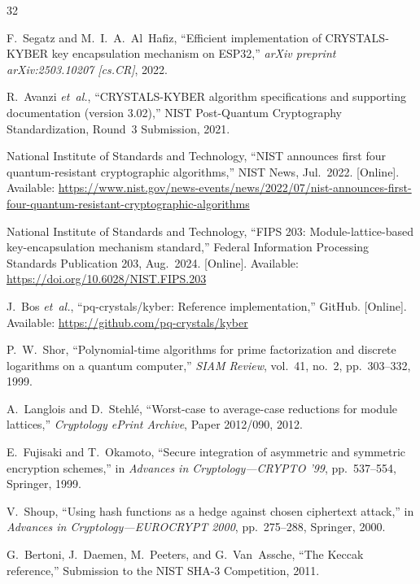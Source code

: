 \documentclass[journal]{IEEEtran}
\begin{document}
\begin{thebibliography}{32}

F.~Segatz and M.~I.~A.~Al~Hafiz, ``Efficient implementation of CRYSTALS-KYBER key encapsulation mechanism on ESP32,'' \emph{arXiv preprint arXiv:2503.10207 [cs.CR]}, 2022.

R.~Avanzi \emph{et~al.}, ``CRYSTALS-KYBER algorithm specifications and supporting documentation (version 3.02),'' NIST Post-Quantum Cryptography Standardization, Round~3 Submission, 2021.

National Institute of Standards and Technology, ``NIST announces first four quantum-resistant cryptographic algorithms,'' NIST News, Jul.\ 2022. [Online]. Available: \url{https://www.nist.gov/news-events/news/2022/07/nist-announces-first-four-quantum-resistant-cryptographic-algorithms}

National Institute of Standards and Technology, ``FIPS 203: Module-lattice-based key-encapsulation mechanism standard,'' Federal Information Processing Standards Publication 203, Aug.\ 2024. [Online]. Available: \url{https://doi.org/10.6028/NIST.FIPS.203}

J.~Bos \emph{et~al.}, ``pq-crystals/kyber: Reference implementation,'' GitHub. [Online]. Available: \url{https://github.com/pq-crystals/kyber}

P.~W.~Shor, ``Polynomial-time algorithms for prime factorization and discrete logarithms on a quantum computer,'' \emph{SIAM Review}, vol.~41, no.~2, pp.~303--332, 1999.

A.~Langlois and D.~Stehl\'{e}, ``Worst-case to average-case reductions for module lattices,'' \emph{Cryptology ePrint Archive}, Paper 2012/090, 2012.

E.~Fujisaki and T.~Okamoto, ``Secure integration of asymmetric and symmetric encryption schemes,'' in \emph{Advances in Cryptology---CRYPTO '99}, pp.~537--554, Springer, 1999.

V.~Shoup, ``Using hash functions as a hedge against chosen ciphertext attack,'' in \emph{Advances in Cryptology---EUROCRYPT 2000}, pp.~275--288, Springer, 2000.

G.~Bertoni, J.~Daemen, M.~Peeters, and G.~Van~Assche, ``The Keccak reference,'' Submission to the NIST SHA-3 Competition, 2011.


\end{thebibliography}
\end{document}
